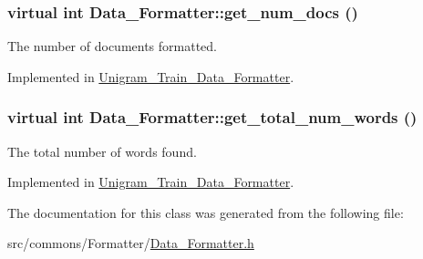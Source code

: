\hypertarget{class_data___formatter_aec61a89d2fc394ac8f28fb502357c90e}{
\subsubsection[{get\_\-num\_\-docs}]{\setlength{\rightskip}{0pt plus 5cm}virtual int Data\_\-Formatter::get\_\-num\_\-docs ()}}
\label{class_data___formatter_aec61a89d2fc394ac8f28fb502357c90e}


The number of documents formatted. 



Implemented in \hyperlink{class_unigram___train___data___formatter_afbc58721bb9c38bdcd2684ef048b6807}{Unigram\_\-Train\_\-Data\_\-Formatter}.

\hypertarget{class_data___formatter_aec312da75df72aa23974051db72e4b69}{
\subsubsection[{get\_\-total\_\-num\_\-words}]{\setlength{\rightskip}{0pt plus 5cm}virtual int Data\_\-Formatter::get\_\-total\_\-num\_\-words ()}}
\label{class_data___formatter_aec312da75df72aa23974051db72e4b69}


The total number of words found. 



Implemented in \hyperlink{class_unigram___train___data___formatter_a89a89ebbf1d42f49f4e2f86307d47bb8}{Unigram\_\-Train\_\-Data\_\-Formatter}.



The documentation for this class was generated from the following file:\begin{DoxyCompactItemize}
\item 
src/commons/Formatter/\hyperlink{_data___formatter_8h}{Data\_\-Formatter.h}\end{DoxyCompactItemize}

